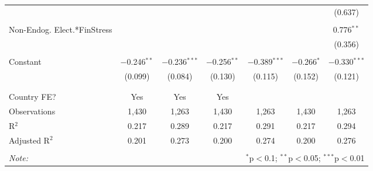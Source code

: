 \begin{table}[!htbp]
\begin{tabular}{@{\extracolsep{5pt}}lcccccc}
  &  &  &  &  &  & (0.637) \\ 
  & & & & & & \\ 
 Non-Endog. Elect.*FinStress &  &  &  &  &  & 0.776$^{**}$ \\ 
  &  &  &  &  &  & (0.356) \\ 
  & & & & & & \\ 
 Constant & $-$0.246$^{**}$ & $-$0.236$^{***}$ & $-$0.256$^{**}$ & $-$0.389$^{***}$ & $-$0.266$^{*}$ & $-$0.330$^{***}$ \\ 
  & (0.099) & (0.084) & (0.130) & (0.115) & (0.152) & (0.121) \\ 
  & & & & & & \\ 
\hline \\[-1.8ex] 
Country FE? & Yes & Yes & Yes &  &  &  \\ 
Observations & 1,430 & 1,263 & 1,430 & 1,263 & 1,430 & 1,263 \\ 
R$^{2}$ & 0.217 & 0.289 & 0.217 & 0.291 & 0.217 & 0.294 \\ 
Adjusted R$^{2}$ & 0.201 & 0.273 & 0.200 & 0.274 & 0.200 & 0.276 \\ 
\hline 
\hline \\[-1.8ex] 
\textit{Note:}  & \multicolumn{6}{r}{$^{*}$p$<$0.1; $^{**}$p$<$0.05; $^{***}$p$<$0.01} \\ 
\end{tabular} 
\end{table} 
